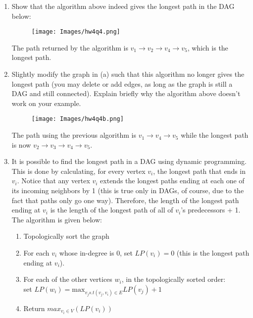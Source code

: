 \documentclass[letterpaper, 11pt]{article}
\begin{document}
\begin{enumerate}
    \begin{enumerate}
        \item Show that the algorithm above indeed gives the longest path in the DAG below:
        \begin{figure}[H]
            \centering
            \texttt{[image: Images/hw4q4.png]}
        \end{figure}

        The path returned by the algorithm is $v_1 \to v_2 \to v_4 \to v_5$, which is the longest path.

        \item Slightly modify the graph in (a) such that this algorithm no longer gives the longest path (you may delete or add edges, as long as the graph is still a DAG and still connected). Explain briefly why the algorithm above doesn’t work on your example.
        \begin{figure}[H]
            \centering
            \texttt{[image: Images/hw4q4b.png]}
        \end{figure}

        The path using the previous algorithm is $v_1 \to v_4 \to v_5$ while the longest path is now $v_2 \to v_3 \to v_4 \to v_5$.
        
        \item It is possible to find the longest path in a DAG using dynamic programming. This is done by calculating, for every vertex $v_i$, the longest path that ends in $v_i$. Notice that any vertex $v_i$ extends the longest paths ending at each one of its incoming neighbors by 1 (this is true only in DAGs, of course, due to the fact that paths only go one way). Therefore, the length of the longest path ending at $v_i$ is the length of the longest path of all of $v_i$’s predecessors + 1. The algorithm is given below:

        \begin{enumerate}
            \item Topologically sort the graph
            \item For each $v_i$ whose in-degree is 0, set $LP(v_i) = 0$ (this is the longest path ending at $v_i$).
            \item For each of the other vertices $w_i$, in the topologically sorted order:\\
            \parindent\parindent set $LP(w_i) = \text{max}_{v_js.t(v_j,v_i) \in E}LP(v_j) + 1$
            \item Return $max_{v_i\in V}(LP(v_i))$
        \end{enumerate}


\end{enumerate}
\end{enumerate}
\end{document}
